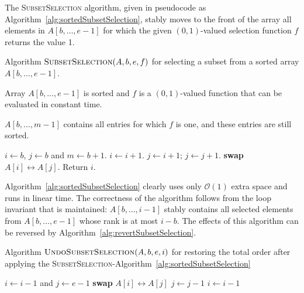 \documentclass{elsart}
\newcommand{\Oh}[1]{\ensuremath{\mathcal{O}(#1)}}
\begin{document}
The \textsc{SubsetSelection} algorithm, given in pseudocode as
Algorithm~\ref{alg:sortedSubsetSelection}, stably moves to the front
of the array all elements in $A[b,\ldots, e-1]$ for which the given
$(0,1)$-valued selection function $f$ returns the value 1.

\begin{algorithm}
  \caption{Algorithm
    $\textsc{SubsetSelection}(A,b,e,f)$ for selecting a
    subset from a sorted array $A[b,\ldots, e-1]$.} 
  \label{alg:sortedSubsetSelection}\label{alg:subsetselection}
  \begin{algorithmic}[1]
    \REQUIRE Array $A[b,\ldots, e-1]$ is sorted and $f$ is a 
    $(0,1)$-valued function that can be evaluated in constant
    time.
    
    \ENSURE $A[b,\ldots, m-1]$ contains all entries for which
    $f$ is one, and these entries are still sorted.

    \STATE $i\gets b$, $j\gets b$ and $m\gets b+1$. 
        \STATE $i\gets i+1$.  
      \ENDWHILE
      \STATE $j\gets i+1$;
        \STATE $j\gets j+1$.  
      \ENDWHILE
        \STATE \textbf{swap} $A[i]\leftrightarrow A[j]$.
      \ENDIF
    \ENDWHILE
    \STATE Return $i$.
  \end{algorithmic}
\end{algorithm}

Algorithm~\ref{alg:sortedSubsetSelection} clearly uses only \Oh{1}
extra space and runs in linear time. The correctness of the algorithm
follows from the loop invariant that is maintained: $A[b,\ldots, i-1]$
stably contains all selected elements from $A[b,\ldots, e-1]$ whose rank
is at most $i-b$.  The effects of this algorithm can be reversed by
Algorithm~\ref{alg:revertSubsetSelection}.

\begin{algorithm}
  \caption{Algorithm $\textsc{UndoSubsetSelection}(A,b,e,i)$
    for restoring the total order after applying the 
    \textsc{SubsetSelection}-Algorithm~\ref{alg:sortedSubsetSelection}}
  \label{alg:revertSubsetSelection}\label{alg:undosubsetselection}
  \begin{algorithmic}[1]

    
    \STATE $i\gets i-1$ and $j\gets e-1$
        \STATE \textbf{swap} $A[i]\leftrightarrow A[j]$
        \STATE $j\gets j-1$
      \ENDIF
      \STATE $i\gets i-1$
    \ENDWHILE

  \end{algorithmic}
\end{algorithm}
\end{document}
